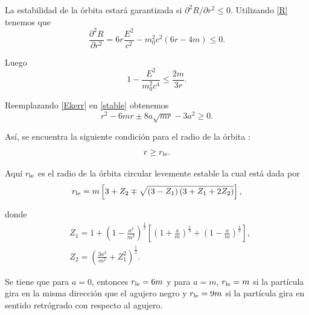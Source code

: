 La estabilidad de la \'orbita estar\'a garantizada si $\partial^2 R/\partial r^2 \leq 0$. Utilizando \eqref{R} tenemos que
\begin{equation}
\frac{\partial^2 R}{\partial r^2}=6r\frac{E^2}{c^2}-m_0^2c^2\left(6r-4m\right) \leq 0.
\end{equation}

Luego
\begin{equation}\label{stable}
1-\frac{E^2}{m_0^2c^4} \leq \frac{2m}{3r}.
\end{equation}

Reemplazando \eqref{Ekerr} en \eqref{stable} obtenemos
\begin{equation}
r^2-6mr\pm 8a\sqrt{mr}-3a^2 \geq 0.
\end{equation}

As\'i, se encuentra la siguiente condici\'on para el radio de la \'orbita :
\begin{equation}
r \geq r_{\rm le}.
\end{equation}

Aqu\'i $r_{\rm le}$ es el radio de la \'orbita circular levemente estable la cual est\'a dada por
\begin{equation}
r_{\rm le}=m\left[ 3+Z_2\mp \sqrt{\left(3-Z_1\right)\left( 3+Z_1+2Z_2\right)}\right],
\end{equation}

donde
\begin{eqnarray}
&Z_1=1+\left( 1-\frac{a^2}{m^2}\right)^{\frac{1}{3}}\left[\left( 1+\frac{a}{m}\right)^{\frac{1}{3}}+\left( 1-\frac{a}{m}\right)^{\frac{1}{3}} \right] ,\\
&Z_2 =\left(\frac{3a^2}{m^2}+Z_1^2 \right)^{\frac{1}{2}}.
\end{eqnarray}

Se tiene que para $a=0$, entonces $r_{\rm le}=6m$ y para $a=m$, $r_{\rm le}=m$ si la part\'icula gira en la misma direcci\'on que el agujero negro y $r_{\rm le}=9m$ si la part\'icula gira en sentido retr\'ogrado con respecto al agujero.\\

